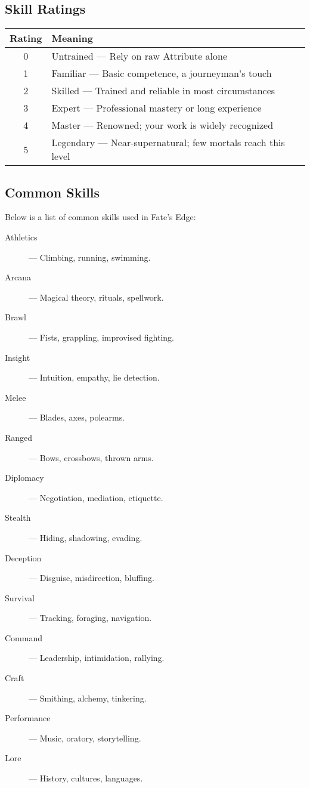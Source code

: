 \subsection*{Skill Ratings}

\begin{center}
\begin{tabular}{cl}
\toprule
\textbf{Rating} & \textbf{Meaning} \\
\midrule
0 & Untrained — Rely on raw Attribute alone \\
1 & Familiar — Basic competence, a journeyman's touch \\
2 & Skilled — Trained and reliable in most circumstances \\
3 & Expert — Professional mastery or long experience \\
4 & Master — Renowned; your work is widely recognized \\
5 & Legendary — Near-supernatural; few mortals reach this level \\
\bottomrule
\end{tabular}
\end{center}

\subsection*{Common Skills}

Below is a list of common skills used in Fate's Edge:

\begin{description}
  \item[Athletics]  — Climbing, running, swimming.
  \item[Arcana]  — Magical theory, rituals, spellwork.
  \item[Brawl]  — Fists, grappling, improvised fighting.
  \item[Insight]  — Intuition, empathy, lie detection.
  \item[Melee]  — Blades, axes, polearms.
  \item[Ranged]  — Bows, crossbows, thrown arms.
  \item[Diplomacy]  — Negotiation, mediation, etiquette.
  \item[Stealth]  — Hiding, shadowing, evading.
  \item[Deception]  — Disguise, misdirection, bluffing.
  \item[Survival]  — Tracking, foraging, navigation.
  \item[Command]  — Leadership, intimidation, rallying.
  \item[Craft]  — Smithing, alchemy, tinkering.
  \item[Performance]  — Music, oratory, storytelling.
  \item[Lore]  — History, cultures, languages.
\end{description}

